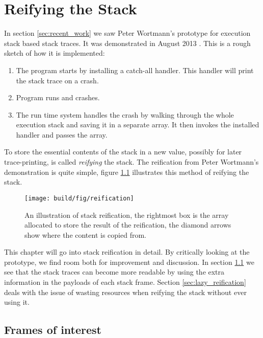 \chapter{Reifying the Stack} \label{chp:reifying_the_stack}

In section \ref{sec:recent_work} we saw Peter Wortmann's prototype for
execution stack based stack traces. It was demonstrated in August
2013 \cite{stack_traces_ticket}. This is a rough sketch of how it is
implemented:

\begin{enumerate}
  \item
    The program starts by installing a catch-all handler. This handler will
    print the stack trace on a crash.
  \item
    Program runs and crashes.
  \item
    The run time system handles the crash by walking through the whole
    execution stack and saving it in a separate array. It then invokes the
    installed handler and passes the array.
\end{enumerate}

To store the essential contents of the stack in a new value,
possibly for later trace-printing, is called \emph{reifying} the
stack. The reification from Peter Wortmann's demonstration is
quite simple, figure \ref{fig:reification} illustrates
this method of reifying the stack.

\begin{figure}
\begin{mdframed}
  \texttt{[image: build/fig/reification]}
  \caption{An illustration of stack reification, the rightmost box
  is the array allocated to store the result of the reification, the
  diamond arrows show where the content is copied from.}
  \label{fig:reification}
\end{mdframed}
\end{figure}

This chapter will go into
stack reification in detail. By critically looking
at the prototype, we find room both for improvement and discussion.
In section \ref{sec:frames_of_interest} we see that the stack traces can become more
readable by using the extra information in the payloads of each stack
frame. Section \ref{sec:lazy_reification} deals with the issue of wasting
resources when reifying the stack without ever using it.

\section{Frames of interest} \label{sec:frames_of_interest}

